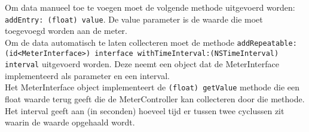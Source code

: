 Om data manueel toe te voegen moet de volgende methode uitgevoerd worden: \texttt{\justify addEntry: (float) value}. De value parameter is de waarde die moet toegevoegd worden aan de meter. \\

Om de data automatisch te laten collecteren moet de methode \texttt{\justify addRepeatable:(id<MeterInterface>) interface withTimeInterval:(NSTimeInterval) interval} uitgevoerd worden. Deze neemt een object dat de MeterInterface implementeerd als parameter en een interval.\\
Het MeterInterface object implementeert de \texttt{\justify (float) getValue} methode die een float waarde terug geeft die de MeterController kan collecteren door die methode.\\
Het interval geeft aan (in seconden) hoeveel tijd er tussen twee cyclussen zit waarin de waarde opgehaald wordt.
